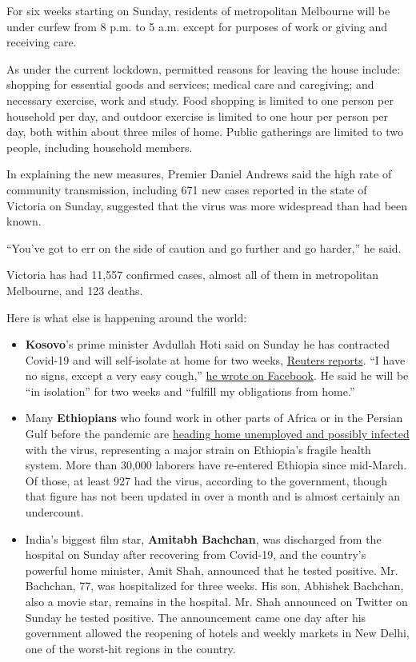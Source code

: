 For six weeks starting on Sunday, residents of metropolitan Melbourne
will be under curfew from 8 p.m. to 5 a.m. except for purposes of work
or giving and receiving care.

As under the current lockdown, permitted reasons for leaving the house
include: shopping for essential goods and services; medical care and
caregiving; and necessary exercise, work and study. Food shopping is
limited to one person per household per day, and outdoor exercise is
limited to one hour per person per day, both within about three miles of
home. Public gatherings are limited to two people, including household
members.

In explaining the new measures, Premier Daniel Andrews said the high
rate of community transmission, including 671 new cases reported in the
state of Victoria on Sunday, suggested that the virus was more
widespread than had been known.

``You've got to err on the side of caution and go further and go
harder,'' he said.

Victoria has had 11,557 confirmed cases, almost all of them in
metropolitan Melbourne, and 123 deaths.

Here is what else is happening around the world:

\begin{itemize}
\item
  \textbf{Kosovo}'s prime minister Avdullah Hoti said on Sunday he has
  contracted Covid-19 and will self-isolate at home for two weeks,
  \href{https://www.reuters.com/article/us-health-coronavirus-kosovo-primeminist/kosovo-prime-minister-says-he-has-covid-19-idUSKBN24Y0ON}{Reuters
  reports}. ``I have no signs, except a very easy cough,''
  \href{https://www.facebookcorewwwi.onion/avdullah.hoti/posts/3508635622531100}{he
  wrote on Facebook}. He said he will be ``in isolation'' for two weeks
  and ``fulfill my obligations from home.''
\item
  Many \textbf{Ethiopians} who found work in other parts of Africa or in
  the Persian Gulf before the pandemic are
  \href{https://www.nytimes3xbfgragh.onion/2020/08/01/world/africa/ethiopian-migrant-workers-coronavirus.html?action=click\&module=RelatedLinks\&pgtype=Article}{heading
  home unemployed and possibly infected} with the virus, representing a
  major strain on Ethiopia's fragile health system. More than 30,000
  laborers have re-entered Ethiopia since mid-March. Of those, at least
  927 had the virus, according to the government, though that figure has
  not been updated in over a month and is almost certainly an
  undercount.
\item
  India's biggest film star, \textbf{Amitabh Bachchan}, was discharged
  from the hospital on Sunday after recovering from Covid-19, and the
  country's powerful home minister, Amit Shah, announced that he tested
  positive. Mr. Bachchan, 77, was hospitalized for three weeks. His son,
  Abhishek Bachchan, also a movie star, remains in the hospital. Mr.
  Shah announced on Twitter on Sunday he tested positive. The
  announcement came one day after his government allowed the reopening
  of hotels and weekly markets in New Delhi, one of the worst-hit
  regions in the country.
\end{itemize}


